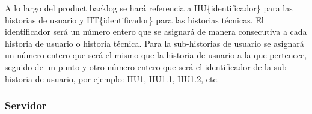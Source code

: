 A lo largo del product backlog  se hará referencia a HU\{identificador\} para las historias de usuario y HT\{identificador\} para las historias técnicas. El identificador será un número entero que se asignará de manera consecutiva a cada historia de usuario o historia técnica. Para la sub-historias de usuario se asignará un número entero que será el mismo que la historia de usuario a la que pertenece, seguido de un punto y otro número entero que será el identificador de la sub-historia de usuario, por ejemplo: HU1, HU1.1, HU1.2, etc.

\subsubsection{Servidor}
\renewcommand{\arraystretch}{1.3} %

